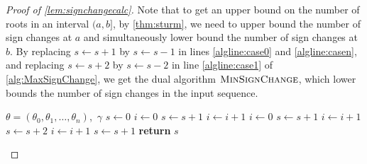 \documentclass[a4paper,UKenglish,cleveref,autoref,thm-restate]{lipics-v2021}
\begin{document}
\begin{proof}[Proof of \cref{lem:signchangecalc}]
	Note that to get an upper bound on the number of roots in an
	interval $(a,b]$, by \cref{thm:sturm}, we need to upper bound the
	number of sign changes at $a$ and simultaneously lower bound the
	number of sign changes at $b$. By replacing $s\gets s+1$ by
	$s\gets s-1$ in lines \ref{algline:case0} and \ref{algline:casen},
	and replacing $s\gets s+2$ by $s\gets s-2$ in line
	\ref{algline:case1} of \cref{alg:MaxSignChange}, we get the dual
	algorithm $\textsc{MinSignChange}$, which lower bounds the number of
	sign changes in the input sequence.
	\begin{algorithm}[!h]
		\caption{\textsc{MaxSignChange}}\label{alg:MaxSignChange}
		\begin{algorithmic}[1]
			{$\theta=(\theta_0,\theta_1,\ldots,\theta_n)$,~$\gamma$}
			\State $s\gets0$  
			\State $i\gets0$
			\State $s\gets s+1$ 
			\EndIf
			\State $i\gets i+1$
			\EndWhile
			\Statex
			\State $i\gets0$
			\State $s\gets s+1$\label{algline:case0}
			\EndIf
			\State $i\gets i+1$
			\Statex
			\State $s\gets s+2$\label{algline:case1}
			\EndIf
			\EndIf
			\State $i\gets i+1$
			\EndWhile
			\Statex
			\State $s\gets s+1$\label{algline:casen}
			\EndIf
			\State \textbf{return} $s$
			\EndProcedure
		\end{algorithmic}
	\end{algorithm}
\end{proof}
\end{document}
